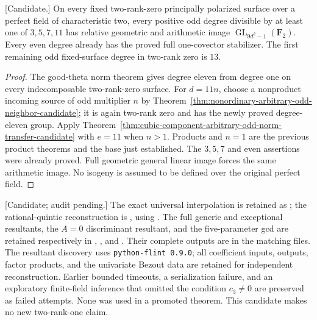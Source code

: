 \begin{corollary}
\label{cor:f0-odd-multiples-eleven-candidate}
\textup{[Candidate.]}
On every fixed two-rank-zero principally polarized surface over a perfect
field of characteristic two, every positive odd degree divisible by at
least one of $3,5,7,11$ has relative geometric and arithmetic image
$\operatorname{GL}_{9d^2-1}(\mathbf F_2)$. Every even degree already
has the proved full one-covector stabilizer. The first remaining odd
fixed-surface degree in two-rank zero is $13$.
\end{corollary}
\begin{proof}
The good-theta norm theorem gives degree eleven from degree one on every
indecomposable two-rank-zero surface. For $d=11n$, choose a nonproduct
incoming source of odd multiplier $n$ by
Theorem~\ref{thm:nonordinary-arbitrary-odd-neighbor-candidate}; it is
again two-rank zero and has the newly proved degree-eleven group.
Apply Theorem~\ref{thm:cubic-component-arbitrary-odd-norm-transfer-candidate}
with $e=11$ when $n>1$. Products and $n=1$ are the previous product
theorems and the base just established. The $3,5,7$ and even assertions
were already proved. Full geometric general linear image forces the
same arithmetic image. No isogeny is assumed to be defined over the
original perfect field.
\end{proof}

\begin{remark}
\label{rem:uniform-eleven-verification-scope-candidate}
\textup{[Candidate; audit pending.]}
The exact universal interpolation is retained as
;
the rational-quintic reconstruction is
, using
.
The full generic and exceptional resultants, the $A=0$ discriminant
resultant, and the five-parameter gcd are retained respectively in
,
, and
.
Their complete outputs are in the matching
 files. The resultant discovery uses
\texttt{python-flint 0.9.0}; all coefficient inputs, outputs, factor
products, and the univariate Bezout data are retained for independent
reconstruction. Earlier bounded timeouts, a serialization failure, and
an exploratory finite-field inference that omitted the condition
$c_3\ne0$ are preserved as failed attempts. None was used in a
promoted theorem. This candidate makes no new two-rank-one claim.
\end{remark}
